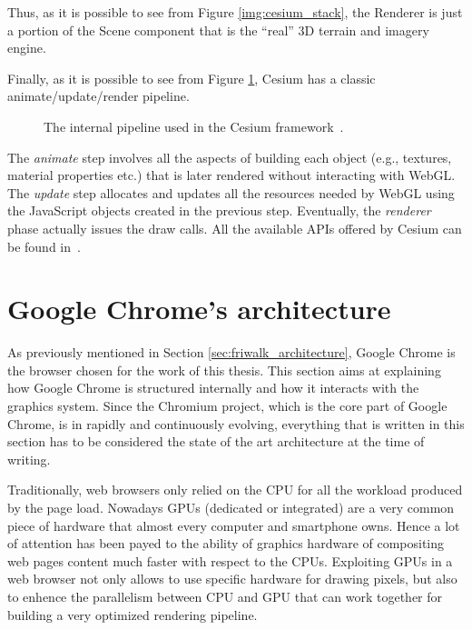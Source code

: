 Thus, as it is possible to see from Figure \ref{img:cesium_stack},
the Renderer is just a portion of the Scene component that is the ``real'' 3D
terrain and imagery engine.

Finally, as it is possible to see from Figure \ref{img:cesium_pipeline},
Cesium has a classic animate/update/render pipeline.
\begin{figure}[!htb]
    \caption{The internal pipeline used in the Cesium framework~\cite{fig_cesium_pipeline}.}
    \label{img:cesium_pipeline}
\end{figure}

The \emph{animate} step involves all the aspects of building each object (e.g.,
textures, material properties etc.) that is later rendered without interacting with
WebGL. The \emph{update} step allocates and updates all the resources needed by
WebGL using the JavaScript objects created in the previous step. Eventually, the
\emph{renderer} phase actually issues the draw calls. All the available APIs
offered by Cesium can be found in~\cite{cesiumapi}.


\section{Google Chrome's architecture}
As previously mentioned in Section \ref{sec:friwalk_architecture}, Google Chrome
is the browser chosen for the work of this thesis. This section aims at explaining
how Google Chrome is structured internally and how it interacts with the graphics
system. Since the Chromium project, which is the core part of Google Chrome, is
in rapidly and continuously evolving, everything that is written in this section
has to be considered the state of the art architecture at the time of writing.

Traditionally, web browsers only relied on the CPU for all the workload produced
by the page load. Nowadays GPUs (dedicated or integrated) are a very common piece
of hardware that almost every computer and smartphone owns. Hence a lot of attention
has been payed to the ability of graphics hardware of compositing web pages content
much faster with respect to the CPUs. Exploiting GPUs in a web
browser not only allows to use specific hardware for drawing pixels, but also to
enhence the parallelism between CPU and GPU that can work together for building
a very optimized rendering pipeline.

